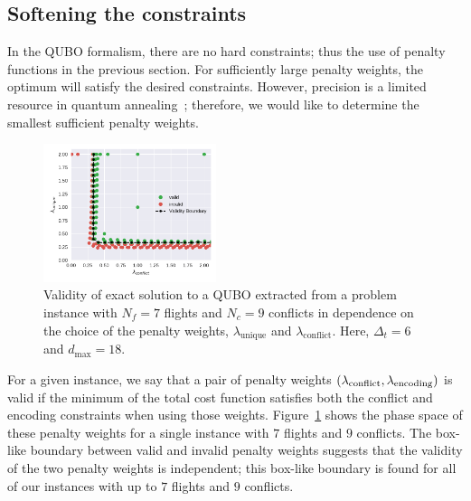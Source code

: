 \subsection{Softening the constraints}
In the QUBO formalism, there are no hard constraints; thus the use of penalty functions in the previous section.
For sufficiently large penalty weights, the optimum will satisfy the desired constraints.
However, precision is a limited resource in quantum annealing~\cite{TODO:D-Wave-precision}; therefore, we would like to determine the smallest sufficient penalty weights.

\begin{figure}[h]
\centering
\includegraphics[width=0.45\textwidth]{./pics/validity_boundary_example.pdf}
\caption[Penalty weight phase diagram]{Validity of exact solution to a QUBO extracted from a problem instance with $N_f=7$ flights and $N_c=9$ conflicts in dependence on the choice of the penalty weights, $\lambda_\text{unique}$ and $\lambda_\text{conflict}$. Here, $\Delta_t=6$ and $d_\text{max}=18$.}
\label{fig:penalty_weights}
\end{figure}

For a given instance, we say that a pair of penalty weights $(\lambda_{\mathrm{conflict}}, \lambda_{\mathrm{encoding}})$ is valid if the minimum of the total cost function satisfies both the conflict and encoding constraints when using those weights.
Figure~\ref{fig:penalty_weights} shows the phase space of these penalty weights for a single instance with $7$ flights and $9$ conflicts.
The box-like boundary between valid and invalid penalty weights suggests that the validity of the two penalty weights is independent; 
this box-like boundary is found for all of our instances with up to $7$ flights and $9$ conflicts.

